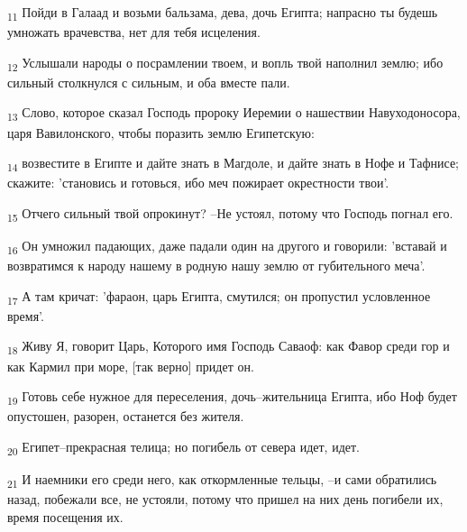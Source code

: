 \begin{tcolorbox}
\textsubscript{11} Пойди в Галаад и возьми бальзама, дева, дочь Египта; напрасно ты будешь умножать врачевства, нет для тебя исцеления.
\end{tcolorbox}
\begin{tcolorbox}
\textsubscript{12} Услышали народы о посрамлении твоем, и вопль твой наполнил землю; ибо сильный столкнулся с сильным, и оба вместе пали.
\end{tcolorbox}
\begin{tcolorbox}
\textsubscript{13} Слово, которое сказал Господь пророку Иеремии о нашествии Навуходоносора, царя Вавилонского, чтобы поразить землю Египетскую:
\end{tcolorbox}
\begin{tcolorbox}
\textsubscript{14} возвестите в Египте и дайте знать в Магдоле, и дайте знать в Нофе и Тафнисе; скажите: 'становись и готовься, ибо меч пожирает окрестности твои'.
\end{tcolorbox}
\begin{tcolorbox}
\textsubscript{15} Отчего сильный твой опрокинут? --Не устоял, потому что Господь погнал его.
\end{tcolorbox}
\begin{tcolorbox}
\textsubscript{16} Он умножил падающих, даже падали один на другого и говорили: 'вставай и возвратимся к народу нашему в родную нашу землю от губительного меча'.
\end{tcolorbox}
\begin{tcolorbox}
\textsubscript{17} А там кричат: 'фараон, царь Египта, смутился; он пропустил условленное время'.
\end{tcolorbox}
\begin{tcolorbox}
\textsubscript{18} Живу Я, говорит Царь, Которого имя Господь Саваоф: как Фавор среди гор и как Кармил при море, [так верно] придет он.
\end{tcolorbox}
\begin{tcolorbox}
\textsubscript{19} Готовь себе нужное для переселения, дочь--жительница Египта, ибо Ноф будет опустошен, разорен, останется без жителя.
\end{tcolorbox}
\begin{tcolorbox}
\textsubscript{20} Египет--прекрасная телица; но погибель от севера идет, идет.
\end{tcolorbox}
\begin{tcolorbox}
\textsubscript{21} И наемники его среди него, как откормленные тельцы, --и сами обратились назад, побежали все, не устояли, потому что пришел на них день погибели их, время посещения их.
\end{tcolorbox}
